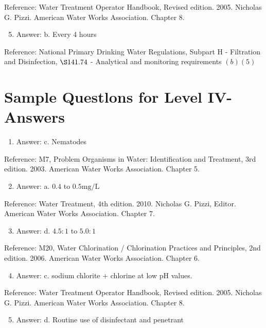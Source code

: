 \documentclass[10pt]{article}
\begin{document}
Reference: Water Treatment Operator Handbook, Revised edition. 2005. Nicholas G. Pizzi. American Water Works Association. Chapter 8.

\begin{enumerate}
  \setcounter{enumi}{4}
  \item Answer: b. Every 4 hours
\end{enumerate}

Reference: National Primary Drinking Water Regulations, Subpart $\mathrm{H}$ - Filtration and Disinfection, $\S 141.74$ - Analytical and monitoring requirements $(b)(5)$

\section{Sample Questlons for Level IV-Answers}
\begin{enumerate}
  \item Answer: c. Nematodes
\end{enumerate}

Reference: M7, Problem Organisms in Water: Identification and Treatment, 3rd edition. 2003. American Water Works Association. Chapter 5.

\begin{enumerate}
  \setcounter{enumi}{1}
  \item Answer: a. $0.4$ to $0.5 \mathrm{mg} / \mathrm{L}$
\end{enumerate}

Reference: Water Treatment, 4th edition. 2010. Nicholas G. Pizzi, Editor. American Water Works Association. Chapter 7.

\begin{enumerate}
  \setcounter{enumi}{2}
  \item Answer: d. $4.5: 1$ to $5.0: 1$
\end{enumerate}

Reference: M20, Water Chlorination / Chlorination Practices and Principles, 2nd edition. 2006. American Water Works Association. Chapter 6.

\begin{enumerate}
  \setcounter{enumi}{3}
  \item Answer: c. sodium chlorite + chlorine at low $\mathrm{pH}$ values.
\end{enumerate}

Reference: Water Treatment Operator Handbook, Revised edition. 2005. Nicholas G. Pizzi. American Water Works Association. Chapter 8.

\begin{enumerate}
  \setcounter{enumi}{4}
  \item Answer: d. Routine use of disinfectant and penetrant
\end{enumerate}
\end{document}
